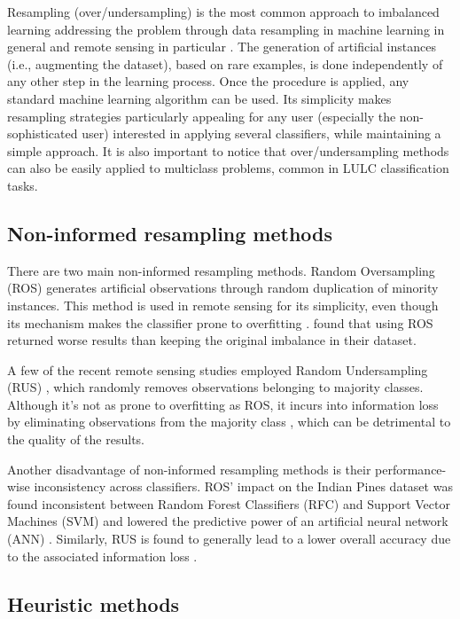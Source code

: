 \documentclass[remotesensing,article,submit,moreauthors,pdftex]{Definitions/mdpi}
\begin{document}
\begin{paracol}{2}
Resampling (over/undersampling) is the most common approach to imbalanced
learning addressing the problem through data resampling in machine learning in
general and remote sensing in particular \cite{Feng2019}. The generation of
artificial instances (i.e., augmenting the dataset), based on rare examples,
is done independently of any other step in the learning process. Once the
procedure is applied, any standard machine learning algorithm can be used. Its
simplicity makes resampling strategies particularly appealing for any user
(especially the non-sophisticated user) interested in applying several
classifiers, while maintaining a simple approach.  It is also important to
notice that over/undersampling methods can also be easily applied to
multiclass problems, common in LULC classification tasks.

\subsection{Non-informed resampling methods}

There are two main non-informed resampling methods. Random Oversampling (ROS)
generates artificial observations through random duplication of minority
instances.  This method is used in remote sensing \cite{Sharififar2019,
Hounkpatin2018} for its simplicity, even though its mechanism makes the
classifier prone to overfitting \cite{Krawczyk2016}. 
\cite{Hounkpatin2018} found that using ROS returned worse results than keeping
the original imbalance in their dataset.

A few of the recent remote sensing studies employed Random Undersampling (RUS)
\cite{Ferreira2019}, which randomly removes
observations belonging to majority classes. Although it's not as prone to
overfitting as ROS, it incurs into information loss by eliminating observations
from the majority class \cite{Feng2019}, which can be detrimental to the
quality of the results.

Another disadvantage of non-informed resampling methods is their performance-wise
inconsistency across classifiers. ROS' impact on the Indian Pines dataset was
found inconsistent between Random Forest Classifiers (RFC) and Support Vector
Machines (SVM) and lowered the predictive power of an artificial neural network
(ANN) \cite{Maxwell2018}. Similarly, RUS is found to generally lead to a lower
overall accuracy due to the associated information loss \cite{Maxwell2018}.

\subsection{Heuristic methods}


\end{paracol}
\end{document}
